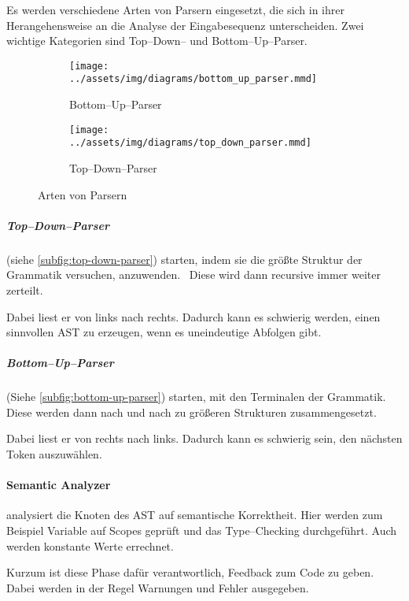 Es werden verschiedene Arten von Parsern eingesetzt, die sich in ihrer Herangehensweise an die Analyse der Eingabesequenz unterscheiden.
Zwei wichtige Kategorien sind Top--Down-- und Bottom--Up--Parser.
\begin{figure}[ht]
    \begin{subfigure}[c]{0.5\textwidth}
        \begin{center}
            \texttt{[image: ../assets/img/diagrams/bottom\_up\_parser.mmd]}
        \end{center}
        \caption{Bottom--Up--Parser}
        \label{subfig:bottom-up-parser}
    \end{subfigure}
    \begin{subfigure}[c]{0.5\textwidth}
        \begin{center}
            \texttt{[image: ../assets/img/diagrams/top\_down\_parser.mmd]}
        \end{center}
        \caption{Top--Down--Parser}
        \label{subfig:top-down-parser}
    \end{subfigure}
    \caption{Arten von Parsern}
    \label{fig:parser-types}
\end{figure}

\subparagraph{Top--Down--Parser} (siehe \autoref{subfig:top-down-parser}) starten, indem sie die größte Struktur der Grammatik versuchen, anzuwenden.~\autocite{geeksforgeeks-2021A}
Diese wird dann recursive immer weiter zerteilt.

Dabei liest er von links nach rechts.
Dadurch kann es schwierig werden, einen sinnvollen \ac{AST} zu erzeugen, wenn es uneindeutige Abfolgen gibt.

\subparagraph{Bottom--Up--Parser} (Siehe \autoref{subfig:bottom-up-parser}) starten, mit den Terminalen der Grammatik.~\autocite{geeksforgeeks-2021B}
Diese werden dann nach und nach zu größeren Strukturen zusammengesetzt.

Dabei liest er von rechts nach links.
Dadurch kann es schwierig sein, den nächsten Token auszuwählen.

\paragraph{Semantic Analyzer} analysiert die Knoten des \ac{AST} auf semantische Korrektheit.
Hier werden zum Beispiel Variable auf Scopes geprüft und das Type--Checking durchgeführt.
Auch werden konstante Werte errechnet.

Kurzum ist diese Phase dafür verantwortlich, Feedback zum Code zu geben.
Dabei werden in der Regel Warnungen und Fehler ausgegeben.

